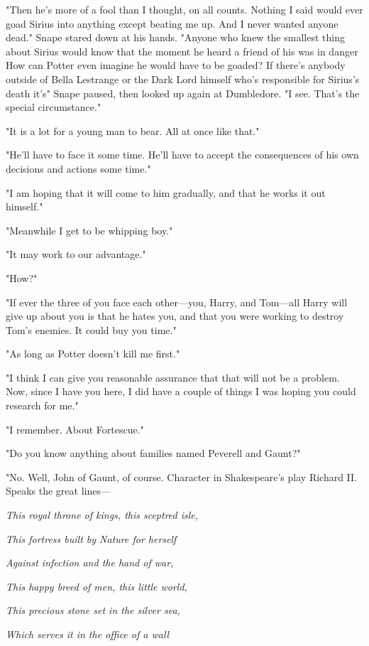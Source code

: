 "Then he's more of a fool than I thought, on all counts. Nothing I said would ever goad Sirius into anything except beating me up. And I never wanted anyone dead." Snape stared down at his hands. "Anyone who knew the smallest thing about Sirius would know that the moment he heard a friend of his was in danger{\el} How can Potter even imagine he would have to be goaded? If there's anybody outside of Bella Lestrange or the Dark Lord himself who's responsible for Sirius's death it's{\el}" Snape paused, then looked up again at Dumbledore. "I see. That's the special circumstance."

"It is a lot for a young man to bear. All at once like that."

"He'll have to face it some time. He'll have to accept the consequences of his own decisions and actions some time."

"I am hoping that it will come to him gradually, and that he works it out himself."

"Meanwhile I get to be whipping boy."

"It may work to our advantage."

"How?"

"If ever the three of you face each other—you, Harry, and Tom—all Harry will give up about you is that he hates you, and that you were working to destroy Tom's enemies. It could buy you time."

"As long as Potter doesn't kill me first."

"I think I can give you reasonable assurance that that will not be a problem. Now, since I have you here, I did have a couple of things I was hoping you could research for me."

"I remember. About Fortescue."

"Do you know anything about families named Peverell and Gaunt?"

"No. Well, John of Gaunt, of course. Character in Shakespeare's play Richard II. Speaks the great lines—

\emph{This royal throne of kings, this sceptred isle,}

\emph{{\el} This fortress built by Nature for herself}

\emph{Against infection and the hand of war,}

\emph{This happy breed of men, this little world,}

\emph{This precious stone set in the silver sea,}

\emph{Which serves it in the office of a wall}

